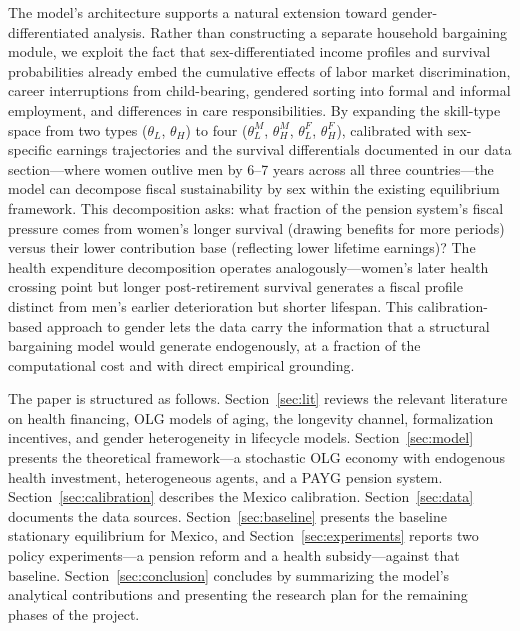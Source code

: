 \documentclass[12pt,a4paper]{article}
\begin{document}
The model's architecture supports a natural extension toward gender-differentiated analysis. Rather than constructing a separate household bargaining module, we exploit the fact that sex-differentiated income profiles and survival probabilities already embed the cumulative effects of labor market discrimination, career interruptions from child-bearing, gendered sorting into formal and informal employment, and differences in care responsibilities. By expanding the skill-type space from two types ($\theta_L$, $\theta_H$) to four ($\theta_L^M$, $\theta_H^M$, $\theta_L^F$, $\theta_H^F$), calibrated with sex-specific earnings trajectories and the survival differentials documented in our data section---where women outlive men by 6--7 years across all three countries---the model can decompose fiscal sustainability by sex within the existing equilibrium framework. This decomposition asks: what fraction of the pension system's fiscal pressure comes from women's longer survival (drawing benefits for more periods) versus their lower contribution base (reflecting lower lifetime earnings)? The health expenditure decomposition operates analogously---women's later health crossing point but longer post-retirement survival generates a fiscal profile distinct from men's earlier deterioration but shorter lifespan. This calibration-based approach to gender lets the data carry the information that a structural bargaining model would generate endogenously, at a fraction of the computational cost and with direct empirical grounding.

The paper is structured as follows. Section~\ref{sec:lit} reviews the relevant literature on health financing, OLG models of aging, the longevity channel, formalization incentives, and gender heterogeneity in lifecycle models. Section~\ref{sec:model} presents the theoretical framework---a stochastic OLG economy with endogenous health investment, heterogeneous agents, and a PAYG pension system. Section~\ref{sec:calibration} describes the Mexico calibration. Section~\ref{sec:data} documents the data sources. Section~\ref{sec:baseline} presents the baseline stationary equilibrium for Mexico, and Section~\ref{sec:experiments} reports two policy experiments---a pension reform and a health subsidy---against that baseline. Section~\ref{sec:conclusion} concludes by summarizing the model's analytical contributions and presenting the research plan for the remaining phases of the project.

\end{document}
